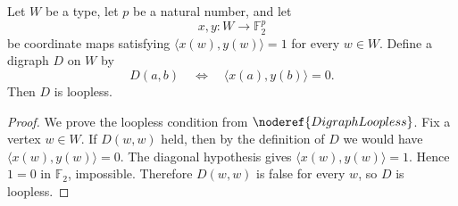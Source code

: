 \begin{helper}
Let \(W\) be a type, let \(p\) be a natural number, and let
\[
  x,y:W\to \mathbb F_2^p
\]
be coordinate maps satisfying \(\langle x(w),y(w)\rangle=1\) for every \(w\in W\).
Define a digraph \(D\) on \(W\) by
\[
  D(a,b)\quad\Longleftrightarrow\quad \langle x(a),y(b)\rangle=0.
\]
Then \(D\) is loopless.
\end{helper}
\begin{proof}
We prove the loopless condition from \(\noderef{DigraphLoopless}\). Fix a vertex
\(w\in W\). If \(D(w,w)\) held, then by the definition of \(D\) we would have
\(\langle x(w),y(w)\rangle=0\). The diagonal hypothesis gives
\(\langle x(w),y(w)\rangle=1\). Hence \(1=0\) in \(\mathbb F_2\), impossible.
Therefore \(D(w,w)\) is false for every \(w\), so \(D\) is loopless.
\end{proof}
